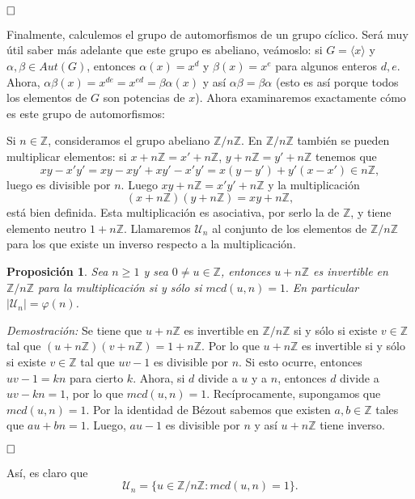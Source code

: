 \documentclass[12pt]{article}
\newtheorem{proposition}[theorem]{Proposición}
\begin{document}
$\hfill \square$

Finalmente, calculemos el grupo de automorfismos de un grupo cíclico. Será muy útil saber más adelante que este grupo es abeliano, veámoslo: si $G = \langle x \rangle $ y $\alpha, \beta \in Aut(G)$, entonces $\alpha (x) = x^d$ y $\beta(x) = x^e$ para algunos enteros $d,e$. Ahora, $\alpha\beta(x)=x^{de} = x^{ed}=\beta \alpha (x)$ y así $\alpha \beta = \beta \alpha$ (esto es así porque todos los elementos de $G$ son potencias de $x$). Ahora examinaremos exactamente cómo es este grupo de automorfismos: 

Si $n \in \mathbb{Z}$, consideramos el grupo abeliano $\mathbb{Z}/n\mathbb{Z}$. En $\mathbb{Z}/n\mathbb{Z}$ también se pueden multiplicar elementos: si $x+n\mathbb{Z}=x'+n\mathbb{Z}$, $y +n\mathbb{Z}=y'+n\mathbb{Z}$ tenemos que $$xy-x'y' = xy-xy'+xy'-x'y'= x(y-y')+y'(x-x') \in n\mathbb{Z},$$ luego es divisible por $n$. Luego $xy + n\mathbb{Z} = x'y' +n\mathbb{Z}$ y la multiplicación $$(x+n\mathbb{Z})(y+n\mathbb{Z})=xy+n\mathbb{Z},$$ está bien definida. Esta multiplicación es asociativa, por serlo la de $\mathbb{Z}$, y tiene elemento neutro $1 + n\mathbb{Z}$. Llamaremos \textbf{$\mathcal{U}_n$} al conjunto de los elementos de $\mathbb{Z}/n\mathbb{Z}$ para los que existe un inverso respecto a la multiplicación.

\begin{proposition}Sea $n \geq 1$ y sea $0 \neq u \in \mathbb{Z}$, entonces $u + n\mathbb{Z}$ es invertible en $\mathbb{Z}/n\mathbb{Z}$ para la multiplicación si y sólo si $mcd(u,n)=1.$ En particular $|\mathcal{U}_n| = \varphi(n)$.
\end{proposition}
\emph{Demostración: }Se tiene que $u + n\mathbb{Z}$ es invertible en $\mathbb{Z}/n\mathbb{Z}$ si y sólo si existe $v \in \mathbb{Z}$ tal que $(u +n\mathbb{Z})(v+n\mathbb{Z})=1+n\mathbb{Z}$. Por lo que $u +n\mathbb{Z}$ es invertible si y sólo si existe $v \in \mathbb{Z}$ tal que $uv-1$ es divisible por $n$. Si esto ocurre, entonces $uv-1 = kn$ para cierto $k$. Ahora, si $d$ divide a $u$ y a $n$, entonces $d$ divide a $uv-kn = 1$, por lo que $mcd(u,n)=1$. Recíprocamente, supongamos que $mcd(u,n)=1$. Por la identidad de Bézout sabemos que existen $a,b \in \mathbb{Z}$ tales que $au+bn = 1$. Luego, $au-1$ es divisible por $n$ y así $u+n\mathbb{Z}$ tiene inverso.

$\hfill \square$

Así, es claro que $$\mathcal{U}_n = \lbrace u \in \mathbb{Z}/n\mathbb{Z}:mcd(u,n)=1 \rbrace.$$
\end{document}

